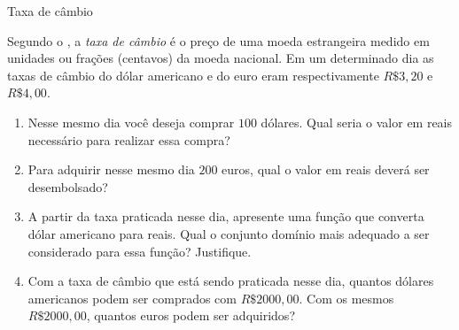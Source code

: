 \practice{ }
\label{\detokenize{AF107-1:praticando}}\begin{task}{Taxa de câmbio}
\label{ativ-cambio}



Segundo o , a \emph{taxa de câmbio} é o preço de uma moeda estrangeira medido em unidades ou frações (centavos) da moeda nacional. Em um determinado dia as taxas de câmbio do dólar americano e do euro eram respectivamente \(R\$ 3,20\) e \(R\$ 4,00\).
\begin{enumerate}
\item {} 
Nesse mesmo dia você deseja comprar \(100\) dólares. Qual seria o valor em reais necessário para realizar essa compra?

\item {} 
Para adquirir nesse mesmo dia \(200\) euros, qual o valor em reais deverá ser desembolsado?

\item {} 
A partir da taxa praticada nesse dia, apresente uma função que converta dólar americano para reais. Qual o conjunto domínio mais adequado a ser considerado para essa função? Justifique.

\item {} 
Com a taxa de câmbio que está sendo praticada nesse dia, quantos dólares americanos podem ser comprados com \(R\$ 2000,00\). Com os mesmos \(R\$ 2000,00\), quantos euros podem ser adquiridos?

\end{enumerate}
\end{task}


